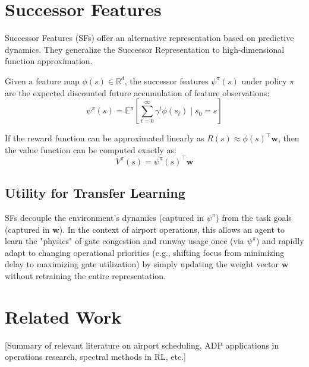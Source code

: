 \section{Successor Features}

Successor Features (SFs) offer an alternative representation based on predictive dynamics. They generalize the Successor Representation to high-dimensional function approximation.

\begin{definition}
	Given a feature map $\phi(s) \in \mathbb{R}^d$, the successor features $\psi^\pi(s)$ under policy $\pi$ are the expected discounted future accumulation of feature observations:
	\begin{equation}
		\psi^\pi(s) = \mathbb{E}^\pi\left[\sum_{t=0}^\infty \gamma^t \phi(s_t) \mid s_0 = s\right]
	\end{equation}
\end{definition}

If the reward function can be approximated linearly as $R(s) \approx \phi(s)^\top \mathbf{w}$, then the value function can be computed exactly as:
%
\begin{equation}
	V^\pi(s) = \psi^\pi(s)^\top \mathbf{w}
\end{equation}

\subsection{Utility for Transfer Learning}
SFs decouple the environment's dynamics (captured in $\psi^\pi$) from the task goals (captured in $\mathbf{w}$). In the context of airport operations, this allows an agent to learn the "physics" of gate congestion and runway usage once (via $\psi^\pi$) and rapidly adapt to changing operational priorities (e.g., shifting focus from minimizing delay to maximizing gate utilization) by simply updating the weight vector $\mathbf{w}$ without retraining the entire representation.

\section{Related Work}

[Summary of relevant literature on airport scheduling, ADP applications in operations research, spectral methods in RL, etc.]